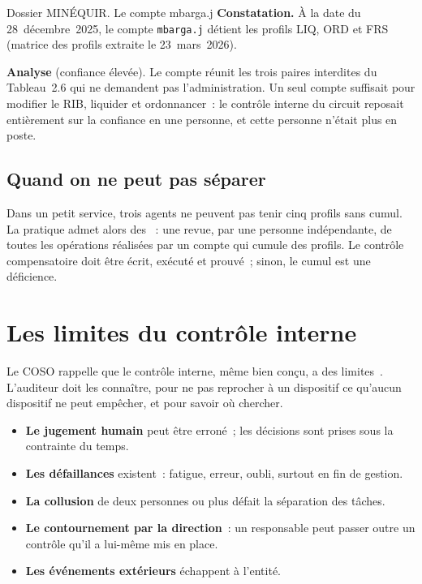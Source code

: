 \begin{boxscenario}{Dossier MINÉQUIR. Le compte mbarga.j}
\textbf{Constatation.} À la date du 28~décembre~2025, le compte
\texttt{mbarga.j} détient les profils LIQ, ORD et FRS (matrice des
profils extraite le 23~mars~2026).

\medskip
\textbf{Analyse} (confiance élevée). Le compte réunit les trois paires
interdites du Tableau~2.6 qui ne demandent pas l'administration. Un seul
compte suffisait pour modifier le RIB, liquider et ordonnancer~: le
contrôle interne du circuit reposait entièrement sur la confiance en une
personne, et cette personne n'était plus en poste.
\end{boxscenario}

\subsection{Quand on ne peut pas séparer}

Dans un petit service, trois agents ne peuvent pas tenir cinq profils
sans cumul. La pratique admet alors des ~: une revue, par une
personne indépendante, de toutes les opérations réalisées par un compte
qui cumule des profils. Le contrôle compensatoire doit être écrit,
exécuté et prouvé~; sinon, le cumul est une déficience.

\separateur

\section{Les limites du contrôle interne}
\label{sec:c02-limites}

Le COSO rappelle que le contrôle interne, même bien conçu, a des
limites~\cite{coso2013icfr}. L'auditeur doit les connaître, pour ne pas
reprocher à un dispositif ce qu'aucun dispositif ne peut empêcher, et pour
savoir où chercher.

\begin{itemize}
    \item \textbf{Le jugement humain} peut être erroné~; les décisions
          sont prises sous la contrainte du temps.
    \item \textbf{Les défaillances} existent~: fatigue, erreur, oubli,
          surtout en fin de gestion.
    \item \textbf{La collusion} de deux personnes ou plus défait la
          séparation des tâches.
    \item \textbf{Le contournement par la direction}~: un responsable peut
          passer outre un contrôle qu'il a lui-même mis en place.
    \item \textbf{Les événements extérieurs} échappent à l'entité.
\end{itemize}

